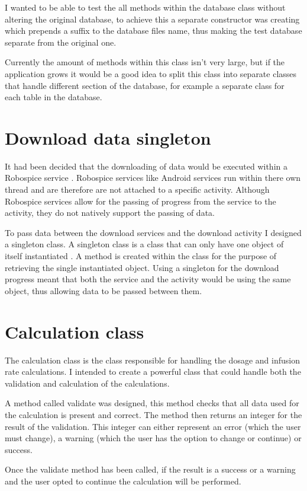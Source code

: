 I wanted to be able to test the all methods within the database class without altering the original database, to achieve this a separate constructor was creating which prepends a suffix to the database files name, thus making the test database separate from the original one.

Currently the amount of methods within this class isn’t very large, but if the application grows it would be a good idea to split this class into separate classes that handle different section of the database, for example a separate class for each table in the database.

\section{Download data singleton}
It had been decided that the downloading of data would be executed within a Robospice service \cite{robospice}. Robospice services like Android services run within there own thread \cite{robospice} and are therefore are not attached to a specific activity. Although Robospice services allow for the passing of progress from the service to the activity, they do not natively support the passing of data.

To pass data between the download services and the download activity I designed a singleton class. A singleton class is a class that can only have one object of itself instantiated \cite{singleton}. A method is created within the class for the purpose of retrieving the single instantiated object. Using a singleton for the download progress meant that both the service and the activity would be using the same object, thus allowing data to be passed between them.

\section{Calculation class}
The calculation class is the class responsible for handling the dosage and infusion rate calculations. I intended to create a powerful class that could handle both the validation and calculation of the calculations.

A method called validate was designed, this method checks that all data used for the calculation is present and correct. The method then returns an integer for the result of the validation. This integer can either represent an error (which the user must change), a warning (which the user has the option to change or continue) or success.

Once the validate method has been called, if the result is a success or a warning and the user opted to continue the calculation will be performed.

